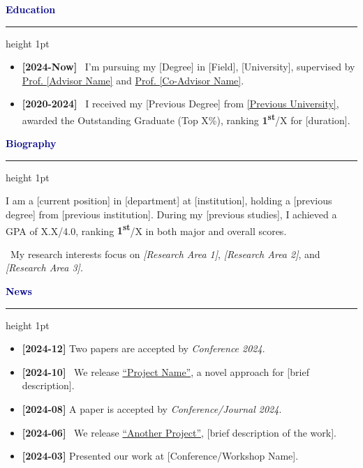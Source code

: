 \documentclass[11pt, a4paper]{article}
\newcommand{\sectioncolor}[1]{\textcolor{darkblue}{#1}}
\newcommand{\cvsection}[1]{
    \vspace{10pt}
    {\Large\bfseries\sectioncolor{#1}}
    \vspace{2pt}
    \hrule height 1pt
    \vspace{8pt}
}
\begin{document}
\begin{minipage}[t]{0.7\textwidth}

\cvsection{Education}

\begin{itemize}[leftmargin=0pt, itemsep=6pt]
    \item \textbf{[2024-Now]} \faSmile\ I'm pursuing my [Degree] in [Field], [University], supervised by \href{https://advisor-website.com}{Prof. [Advisor Name]} and \href{https://co-advisor-website.com}{Prof. [Co-Advisor Name]}.
    
    \item \textbf{[2020-2024]} \faParty\ I received my [Previous Degree] from \href{https://university-website.edu}{[Previous University]}, awarded the Outstanding Graduate (Top X\%), ranking \textbf{1\textsuperscript{st}}/X for [duration].
\end{itemize}

\cvsection{Biography}

I am a [current position] in [department] at [institution], holding a [previous degree] from [previous institution]. During my [previous studies], I achieved a GPA of X.X/4.0, ranking \textbf{1\textsuperscript{st}}/X in both major and overall scores.

\vspace{8pt}

\faMapPin\ My research interests focus on \textit{[Research Area 1]}, \textit{[Research Area 2]}, and \textit{[Research Area 3]}.

\cvsection{News}

\begin{itemize}[leftmargin=0pt, itemsep=4pt]
    \item \textbf{[2024-12]} Two papers are accepted by \textit{Conference 2024}.
    
    \item \textbf{[2024-10]} \faFire\ We release \href{https://arxiv.org/pdf/example}{``Project Name''}, a novel approach for [brief description].
    
    \item \textbf{[2024-08]} A paper is accepted by \textit{Conference/Journal 2024}.
    
    \item \textbf{[2024-06]} \faFire\ We release \href{https://arxiv.org/pdf/example}{``Another Project''}, [brief description of the work].
    
    \item \textbf{[2024-03]} Presented our work at [Conference/Workshop Name].
\end{itemize}


\end{minipage}
\end{document}
